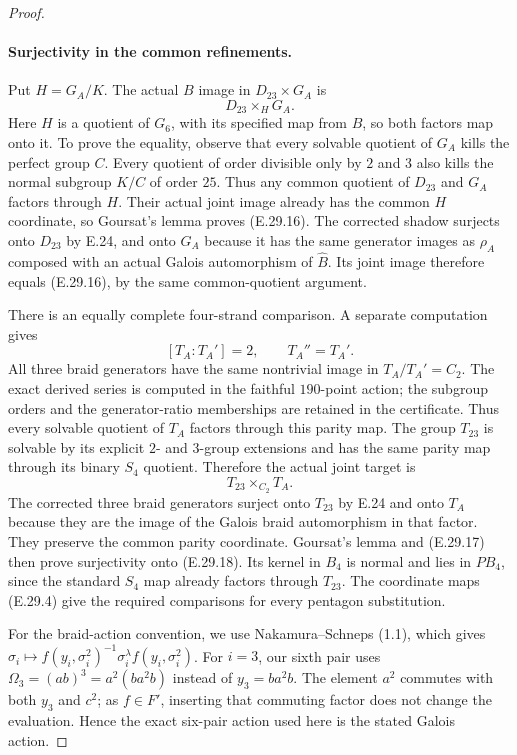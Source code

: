 \begin{proof}
\paragraph{Surjectivity in the common refinements.}
Put $H=G_A/K$. The actual $B$ image in
$D_{23}\times G_A$ is
\[
 D_{23}\mathbin{\times_H}G_A.
 \tag{E.29.16}
\]
Here $H$ is a quotient of $G_6$, with its specified
map from $B$, so both factors map onto it. To prove
the equality, observe that every solvable quotient of
$G_A$ kills the perfect group $C$. Every quotient of
order divisible only by $2$ and $3$ also kills the
normal subgroup $K/C$ of order $25$. Thus any common
quotient of $D_{23}$ and $G_A$ factors through $H$.
Their actual joint image already has the common
$H$ coordinate, so Goursat's lemma proves (E.29.16).
The corrected shadow surjects onto $D_{23}$ by E.24,
and onto $G_A$ because it has the same generator
images as $\rho_A$ composed with an actual Galois
automorphism of $\widehat B$. Its joint image therefore
equals (E.29.16), by the same common-quotient argument.

There is an equally complete four-strand comparison.
A separate computation gives
\[
 [T_A:T_A']=2,\qquad T_A''=T_A'.
 \tag{E.29.17}
\]
All three braid generators have the same nontrivial
image in $T_A/T_A'=C_2$. The exact derived series is
computed in the faithful $190$-point action; the
subgroup orders and the generator-ratio memberships
are retained in the certificate. Thus every solvable
quotient of $T_A$ factors through this parity map.
The group $T_{23}$ is solvable by its explicit
$2$- and $3$-group extensions and has the same parity
map through its binary $S_4$ quotient. Therefore the
actual joint target is
\[
 T_{23}\mathbin{\times_{C_2}}T_A.
 \tag{E.29.18}
\]
The corrected three braid generators surject onto
$T_{23}$ by E.24 and onto $T_A$ because they are the
image of the Galois braid automorphism in that factor.
They preserve the common parity coordinate. Goursat's
lemma and (E.29.17) then prove surjectivity onto
(E.29.18). Its kernel in $B_4$ is normal and lies in
$PB_4$, since the standard $S_4$ map already factors
through $T_{23}$. The coordinate maps (E.29.4) give
the required comparisons for every pentagon
substitution.

For the braid-action convention, we use
Nakamura--Schneps (1.1), which gives
$\sigma_i\mapsto
 f(y_i,\sigma_i^2)^{-1}\sigma_i^\lambda
 f(y_i,\sigma_i^2)$.
For $i=3$, our sixth pair uses
$\Omega_3=(ab)^3=a^2(ba^2b)$ instead of $y_3=ba^2b$.
The element $a^2$ commutes with both $y_3$ and $c^2$;
as $f\in F'$, inserting that commuting factor does
not change the evaluation. Hence the exact six-pair
action used here is the stated Galois action.


\end{proof}
